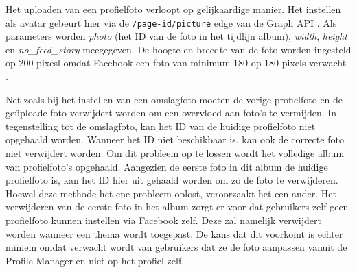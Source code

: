 Het uploaden van een profielfoto verloopt op gelijkaardige manier. Het instellen als avatar gebeurt hier via de \texttt{/page-id/picture} edge van de Graph API \cite{FacebookPagePicture}. Als parameters worden \textit{photo} (het ID van de foto in het tijdlijn album), \textit{width}, \textit{height} en \textit{no{\_}feed{\_}story} meegegeven. De hoogte en breedte van de foto worden ingesteld op 200 pixesl omdat Facebook een foto van minimum 180 op 180 pixels verwacht \cite{FacebookDimensions}. 

Net zoals bij het instellen van een omslagfoto moeten de vorige profielfoto en de ge\"{u}ploade foto verwijdert worden om een overvloed aan foto's te vermijden. In tegenstelling tot de omslagfoto, kan het ID van de huidige profielfoto niet opgehaald worden. Wanneer het ID niet beschikbaar is, kan ook de correcte foto niet verwijdert worden. Om dit probleem op te lossen wordt het volledige album van profielfoto's opgehaald. Aangezien de eerste foto in dit album de huidige profielfoto is, kan het ID hier uit gehaald worden om zo de foto te verwijderen. Hoewel deze methode het ene probleem oplost, veroorzaakt het een ander. Het verwijderen van de eerste foto in het album zorgt er voor dat gebruikers zelf geen profielfoto kunnen instellen via Facebook zelf. Deze zal namelijk verwijdert worden wanneer een thema wordt toegepast. De kans dat dit voorkomt is echter miniem omdat verwacht wordt van gebruikers dat ze de foto aanpassen vanuit de Profile Manager en niet op het profiel zelf. 

